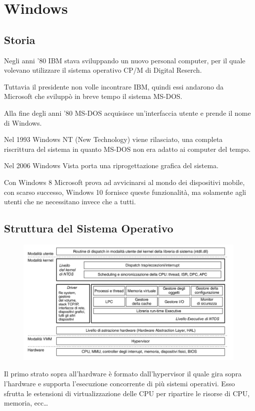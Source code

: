 \section{Windows}
\subsection{Storia}
Negli anni '80 IBM stava sviluppando un nuovo personal computer, per il quale volevano utilizzare il sistema operativo CP/M di Digital Reserch.

Tuttavia il presidente non volle incontrare IBM, quindi essi andarono da Microsoft che sviluppò in breve tempo il sistema MS-DOS.

\spacer
Alla fine degli anni '80 MS-DOS acquisisce un'interfaccia utente e prende il nome di Windows.

\spacer
Nel 1993 Windows NT (New Technology) viene rilasciato, una completa riscrittura del sistema in quanto MS-DOS non era adatto ai computer del tempo.

\spacer
Nel 2006 Windows Vista porta una riprogettazione grafica del sistema.

\spacer
Con Windows 8 Microsoft prova ad avvicinarsi al mondo dei dispositivi mobile, con scarso successo, Windows 10 fornisce queste funzionalità, ma solamente agli utenti che ne necessitano invece che a tutti.

\subsection{Struttura del Sistema Operativo}

\begin{figure}[H]
    \centering
    \includegraphics[width=0.75\linewidth]{assets/Windows-structure.jpeg}
\end{figure}

Il primo strato sopra all'hardware è formato dall'hypervisor il quale gira sopra l'hardware e supporta l'esecuzione concorrente di più sistemi operativi.
Esso sfrutta le estensioni di virtualizzazione delle CPU per ripartire le risorse di CPU, memoria, ecc\dots


